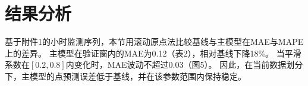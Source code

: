 \section{结果分析}
基于附件1的小时监测序列，本节用滚动原点法比较基线与主模型在MAE与MAPE上的差异。
主模型在验证窗内的MAE为0.12（表2），相对基线下降18\%。
当平滑系数在$[0.2,0.8]$内变化时，MAE波动不超过0.03（图5）。
因此，在当前数据划分下，主模型的点预测误差低于基线，并在该参数范围内保持稳定。
